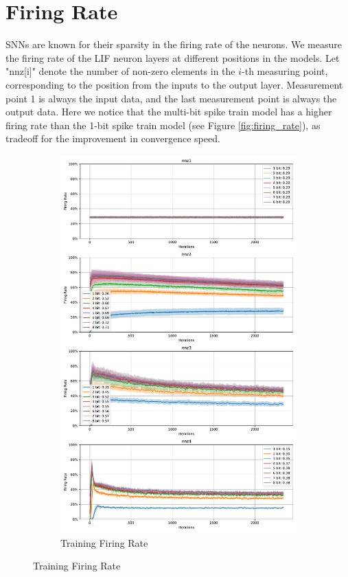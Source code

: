\section{Firing Rate}
\label{sec:firing-rate}
    SNNs are known for their sparsity in the firing rate of the neurons. We measure the firing rate of the LIF neuron layers at different positions in the models. Let "nnz[i]" denote the number of non-zero elements in the $i$-th measuring point, corresponding to the position from the inputs to the output layer. Measurement point 1 is always the input data, and the last measurement point is always the output data. Here we notice that the multi-bit spike train model has a higher firing rate than the 1-bit spike train model (see Figure \ref{fig:firing_rate}), as tradeoff for the improvement in convergence speed. 
    \begin{figure}[!htpb]
        \centering
        \begin{subfigure}[H]{0.9\textwidth}
            \centering
            \includegraphics[width=\textwidth]{../standard/FashionMNIST/plots/fashionmnist_train_firerate.pdf}
            \caption{Training Firing Rate}
        \end{subfigure}
    \end{figure}
